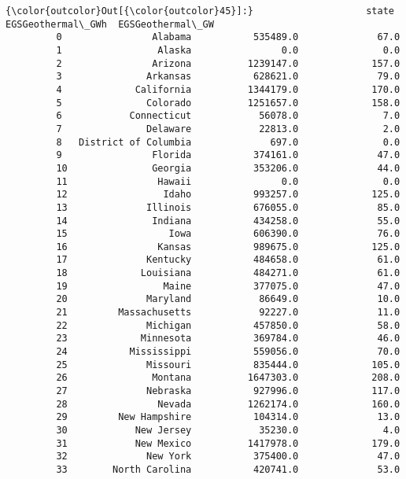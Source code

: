 \documentclass[11pt]{article}
\begin{document}
\begin{Verbatim}[commandchars=\\\{\}]
{\color{outcolor}Out[{\color{outcolor}45}]:}                    state  EGSGeothermal\_GWh  EGSGeothermal\_GW
         0                Alabama           535489.0              67.0
         1                 Alaska                0.0               0.0
         2                Arizona          1239147.0             157.0
         3               Arkansas           628621.0              79.0
         4             California          1344179.0             170.0
         5               Colorado          1251657.0             158.0
         6            Connecticut            56078.0               7.0
         7               Delaware            22813.0               2.0
         8   District of Columbia              697.0               0.0
         9                Florida           374161.0              47.0
         10               Georgia           353206.0              44.0
         11                Hawaii                0.0               0.0
         12                 Idaho           993257.0             125.0
         13              Illinois           676055.0              85.0
         14               Indiana           434258.0              55.0
         15                  Iowa           606390.0              76.0
         16                Kansas           989675.0             125.0
         17              Kentucky           484658.0              61.0
         18             Louisiana           484271.0              61.0
         19                 Maine           377075.0              47.0
         20              Maryland            86649.0              10.0
         21         Massachusetts            92227.0              11.0
         22              Michigan           457850.0              58.0
         23             Minnesota           369784.0              46.0
         24           Mississippi           559056.0              70.0
         25              Missouri           835444.0             105.0
         26               Montana          1647303.0             208.0
         27              Nebraska           927996.0             117.0
         28                Nevada          1262174.0             160.0
         29         New Hampshire           104314.0              13.0
         30            New Jersey            35230.0               4.0
         31            New Mexico          1417978.0             179.0
         32              New York           375400.0              47.0
         33        North Carolina           420741.0              53.0

\end{Verbatim}
\end{document}
